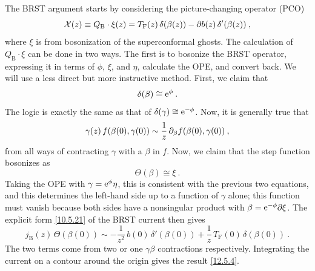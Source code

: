 The BRST argument starts by considering the picture-changing operator (PCO)
\begin{equation}
	\mathcal{X}(z) \equiv Q_{\mathrm{B}}\cdot \xi(z) = T_{\mathrm{F}}(z)\,\delta(\beta(z)) - \partial b(z)\,\delta'(\beta(z)) \:, \label{12.5.4}
\end{equation}
where $\xi$ is from bosonization of the superconformal ghosts. The calculation of $Q_{\mathrm{B}}\cdot \xi$ can be done in two ways. The first is to bosonize the BRST operator, expressing it in terms of $\phi$, $\xi$, and $\eta$, calculate the OPE, and convert back. We will use a less direct but more instructive method. First, we claim that
\begin{equation}
	\delta(\beta) \cong \mathrm{e}^{\phi} \:. \label{12.5.5}
\end{equation}
The logic is exactly the same as that of $\delta(\gamma) \cong \mathrm{e}^{-\phi}$. Now, it is generally true that
\begin{equation}
	\gamma(z)\,f(\beta(0),\gamma(0)) \sim \frac{1}{z}\,\partial_{\beta}f(\beta(0),\gamma(0)) \:, \label{12.5.6}
\end{equation}
from all ways of contracting $\gamma$ with a $\beta$ in $f$. Now, we claim that the step function bosonizes as
\begin{equation}
	\Theta(\beta) \cong \xi \:. \label{12.5.7}
\end{equation}
Taking the OPE with $\gamma = \mathrm{e}^{\phi}\eta$, this is consistent with the previous two equations, and this determines the left-hand side up to a function of $\gamma$ alone; this function must vanish because both sides have a nonsingular product with $\beta = \mathrm{e}^{-\phi}\partial\xi$. The explicit form \eqref{10.5.21} of the BRST current then gives
\begin{equation}
	j_{\mathrm{B}}(z)\,\Theta(\beta(0)) \sim -\frac{1}{z^{2}}\,b(0)\,\delta'(\beta(0)) + \frac{1}{z}\,T_{\mathrm{F}}(0)\,\delta(\beta(0)) \:. \label{12.5.8}
\end{equation}
The two terms come from two or one $\gamma\beta$ contractions respectively. Integrating the current on a contour around the origin gives the result \eqref{12.5.4}.

